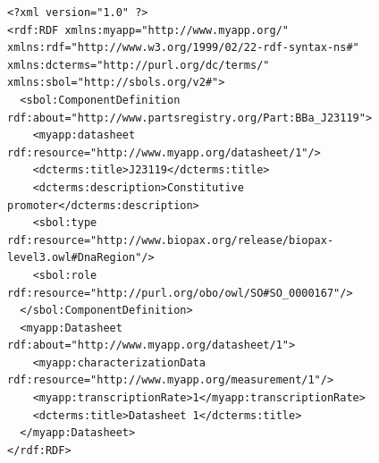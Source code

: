 \begin{figure}[ht]
\begin{lstlisting}
<?xml version="1.0" ?>
<rdf:RDF xmlns:myapp="http://www.myapp.org/" xmlns:rdf="http://www.w3.org/1999/02/22-rdf-syntax-ns#" xmlns:dcterms="http://purl.org/dc/terms/" xmlns:sbol="http://sbols.org/v2#">
  <sbol:ComponentDefinition rdf:about="http://www.partsregistry.org/Part:BBa_J23119">
    <myapp:datasheet rdf:resource="http://www.myapp.org/datasheet/1"/>
    <dcterms:title>J23119</dcterms:title>
    <dcterms:description>Constitutive promoter</dcterms:description>
    <sbol:type rdf:resource="http://www.biopax.org/release/biopax-level3.owl#DnaRegion"/>
    <sbol:role rdf:resource="http://purl.org/obo/owl/SO#SO_0000167"/>
  </sbol:ComponentDefinition>
  <myapp:Datasheet rdf:about="http://www.myapp.org/datasheet/1">
    <myapp:characterizationData rdf:resource="http://www.myapp.org/measurement/1"/>
    <myapp:transcriptionRate>1</myapp:transcriptionRate>
    <dcterms:title>Datasheet 1</dcterms:title>
  </myapp:Datasheet>
</rdf:RDF>

\end{lstlisting}
\label{ser:GenericTopLevel}
\end{figure}